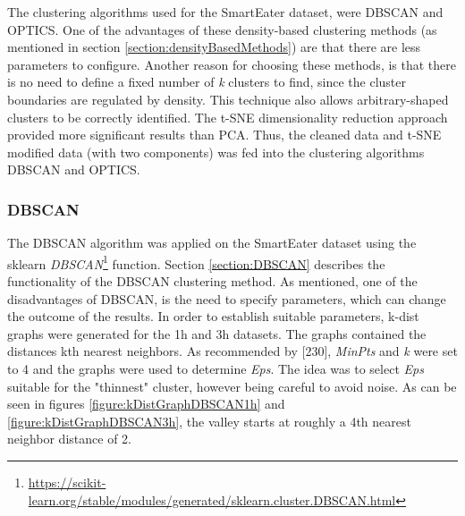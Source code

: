 The clustering algorithms used for the SmartEater dataset, were DBSCAN and OPTICS. One of the advantages of these density-based clustering methods (as mentioned in section \ref{section:densityBasedMethods}) are that there are less parameters to configure. Another reason for choosing these methods, is that there is no need to define a fixed number of \textit{k} clusters to find, since the cluster boundaries are regulated by density. This technique also allows arbitrary-shaped clusters to be correctly identified. The t-SNE dimensionality reduction approach provided more significant results than PCA. Thus, the cleaned data and t-SNE modified data (with two components) was fed into the clustering algorithms DBSCAN and OPTICS.

\subsubsection{DBSCAN}
The DBSCAN algorithm was applied on the SmartEater dataset using the sklearn \textit{DBSCAN}\footnote{\url{https://scikit-learn.org/stable/modules/generated/sklearn.cluster.DBSCAN.html}} function.
Section \ref{section:DBSCAN} describes the functionality of the DBSCAN clustering method. As mentioned, one of the disadvantages of DBSCAN, is the need to specify parameters, which can change the outcome of the results. In order to establish suitable parameters, k-dist graphs were generated for the 1h and 3h datasets. The graphs contained the distances kth nearest neighbors. As recommended by \textcite{DBSCAN}[230], \textit{MinPts} and \textit{k} were set to 4 and the graphs were used to determine \textit{Eps}. The idea was to select \textit{Eps} suitable for the "thinnest" cluster, however being careful to avoid noise. As can be seen in figures \ref{figure:kDistGraphDBSCAN1h} and \ref{figure:kDistGraphDBSCAN3h}, the valley starts at roughly a 4th nearest neighbor distance of 2. 


